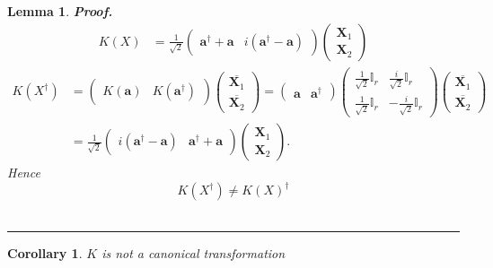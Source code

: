 \documentclass[aps, preprint]{revtex4}
\newtheorem{corollary}[theorem]{Corollary}
\newtheorem{lemma}[theorem]{Lemma}
\newenvironment{proof}[1][Proof]{\noindent\textbf{#1.} }{\ \rule{0.5em}{0.5em}}
\begin{document}
\begin{lemma}
\begin{proof}
\begin{align}
K \left (X\right ) &  =\frac{1}{\sqrt{2}} \left (\begin{array}{cc}\mathbf{a}^{ \dag } +\mathbf{a} & i \left (\mathbf{a}^{ \dag } -\mathbf{a}\right )\end{array}\right ) \left (\begin{array}{c}\mathbf{X}_{1} \\
\mathbf{X}_{2}\end{array}\right )\end{align}
\begin{align*}K \left (X^{ \dag }\right ) &  =\left (\begin{array}{cc}K \left (\mathbf{a}\right ) & K \left (\mathbf{a}^{ \dag }\right )\end{array}\right ) \left (\begin{array}{c}\overline{\mathbf{X}_{1}} \\
\overline{\mathbf{X}_{2}}\end{array}\right ) =\left (\begin{array}{cc}\mathbf{a} & \mathbf{a}^{ \dag }\end{array}\right ) \left (\begin{array}{cc}\frac{1}{\sqrt{2}} \mathbb{I}_{r} & \frac{i}{\sqrt{2}} \mathbb{I}_{r} \\
\frac{1}{\sqrt{2}} \mathbb{I}_{r} &  -\frac{i}{\sqrt{2}} \mathbb{I}_{r}\end{array}\right ) \left (\begin{array}{c}\overline{\mathbf{X}_{1}} \\
\overline{\mathbf{X}_{2}}\end{array}\right ) \\
 &  =\frac{1}{\sqrt{2}} \left (\begin{array}{cc}i \left (\mathbf{a}^{ \dag } -\mathbf{a}\right ) & \mathbf{a}^{ \dag } +\mathbf{a}\end{array}\right ) \left (\begin{array}{c}\mathbf{X}_{1} \\
\mathbf{X}_{2}\end{array}\right )\text{.}\end{align*}Hence
\begin{equation}K \left (X^{ \dag }\right ) \neq K \left (X\right )^{ \dag }
\end{equation}
\end{proof}


\end{lemma}


\begin{corollary}
$K$ is not a canonical transformation 
\end{corollary}
\end{document}
